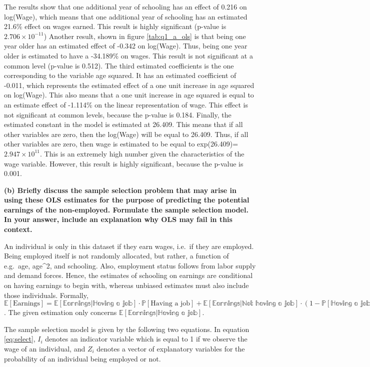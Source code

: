 \documentclass[
]{article}
\begin{document}
The results show that one additional year of schooling has an effect of
0.216 on log(Wage), which means that one additional year of schooling
has an estimated 21.6\% effect on wages earned. This result is highly
significant (p-value is \ensuremath{2.706\times 10^{-11}}) Another
result, shown in figure \ref{tab:q1_a_ols} is that being one year older
has an estimated effect of -0.342 on log(Wage). Thus, being one year
older is estimated to have a -34.189\% on wages. This result is not
significant at a common level (p-value is 0.512). The third estimated
coefficients is the one corresponding to the variable age squared. It
has an estimated coefficient of -0.011, which represents the estimated
effect of a one unit increase in age squared on log(Wage). This also
means that a one unit increase in age squared is equal to an estimate
effect of -1.114\% on the linear representation of wage. This effect is
not significant at common levels, because the p-value is 0.184. Finally,
the estimated constant in the model is estimated at 26.409. This means
that if all other variables are zero, then the log(Wage) will be equal
to 26.409. Thus, if all other variables are zero, then wage is estimated
to be equal to exp(26.409)=\ensuremath{2.947\times 10^{11}}. This is an
extremely high number given the characteristics of the wage variable.
However, this result is highly significant, because the p-value is
0.001.

\textbf{(b) Briefly discuss the sample selection problem that may arise
in using these OLS estimates for the purpose of predicting the potential
earnings of the non-employed. Formulate the sample selection model. In
your answer, include an explanation why OLS may fail in this context.}

An individual is only in this dataset if they earn wages, i.e.~if they
are employed. Being employed itself is not randomly allocated, but
rather, a function of e.g.~age, age\^{}2, and schooling. Also,
employment status follows from labor supply and demand forces. Hence,
the estimates of schooling on earnings are conditional on having
earnings to begin with, whereas unbiased estimates must also include
those individuals. Formally,
\(\mathbb{E}[\text{Earnings}] = \mathbb{E[\text{Earnings}|\text{Having a job}]} \cdot \mathbb{P}[\text{Having a job}] + \mathbb{E[\text{Earnings}|\text{Not having a job}]} \cdot (1-\mathbb{P[\text{Having a job}]})\).
The given estimation only concerns
\(\mathbb{E[\text{Earnings}|\text{Having a job}]}\).

The sample selection model is given by the following two equations. In
equation \ref{eq:select}, \(I_i\) denotes an indicator variable which is
equal to 1 if we observe the wage of an individual, and \(Z_i\) denotes
a vector of explanatory variables for the probability of an individual
being employed or not.
\end{document}
